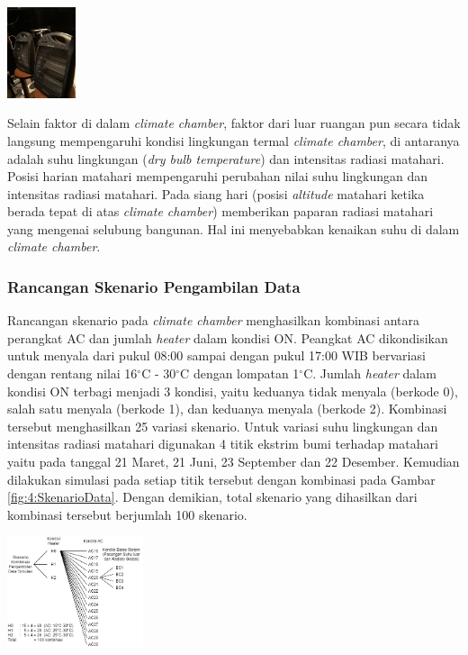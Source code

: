 \documentclass[a4paper,10pt]{article}
\makeatletter
\newenvironment{body}{\begin{multicols}{2}}{\end{multicols}}
\renewenvironment{figure}
{\def\@captype{figure}%
	\captionsetup{labelsep=period,format=hang,font=footnotesize,justification=justified}
}
{}
\makeatother
\begin{document}
\begin{body}
		\begin{figure}
			\centering
			\includegraphics[width=0.15\textwidth]{figures/Heater}
			\caption{Perangkat Heater}
			\label{fig:4:Heater}
		\end{figure}
		\vspace{2mm}
		
		Selain faktor di dalam \textit{climate chamber}, faktor dari luar ruangan pun secara tidak langsung mempengaruhi kondisi lingkungan termal \textit{climate chamber}, di antaranya adalah suhu lingkungan (\textit{dry bulb temperature}) dan intensitas radiasi matahari. Posisi harian matahari mempengaruhi perubahan nilai suhu lingkungan dan intensitas radiasi matahari. Pada siang hari (posisi \textit{altitude} matahari ketika berada tepat di atas \textit{climate chamber}) memberikan paparan radiasi matahari yang mengenai selubung bangunan. Hal ini menyebabkan kenaikan suhu di dalam \textit{climate chamber}.\\
		
		\subsubsection{Rancangan Skenario Pengambilan Data}
		Rancangan skenario pada \textit{climate chamber} menghasilkan kombinasi antara perangkat AC dan jumlah \textit{heater} dalam kondisi ON. Peangkat AC dikondisikan untuk menyala dari pukul 08:00 sampai dengan pukul 17:00 WIB bervariasi dengan rentang nilai 16$^\circ$C - 30$^\circ$C dengan lompatan 1$^\circ$C. Jumlah \textit{heater} dalam kondisi ON terbagi menjadi 3 kondisi, yaitu keduanya tidak menyala (berkode 0), salah satu menyala (berkode 1), dan keduanya menyala (berkode 2). Kombinasi tersebut menghasilkan 25 variasi skenario. Untuk variasi suhu lingkungan dan intensitas radiasi matahari digunakan 4 titik ekstrim bumi terhadap matahari yaitu pada tanggal 21 Maret, 21 Juni, 23 September dan 22 Desember. Kemudian dilakukan simulasi pada setiap titik tersebut dengan kombinasi pada Gambar \ref{fig:4:SkenarioData}. Dengan demikian, total skenario yang dihasilkan dari kombinasi tersebut berjumlah 100 skenario.\\
		
		\begin{figure}
			\centering
			\includegraphics[width=0.3\textwidth]{figures/SkenarioData}
			\caption{Skenario Pengambilan Data}
			\label{fig:4:SkenarioData}
		\end{figure}
		\vspace{2mm}
		

\end{body}
\end{document}
